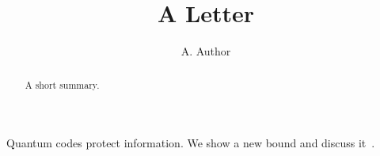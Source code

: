 \documentclass{article}
\begin{document}
\title{A Letter}\author{A. Author}
\begin{abstract}A short summary.\end{abstract}
\maketitle
Quantum codes protect information. We show a new bound and discuss it~\cite{a}.

\end{document}
